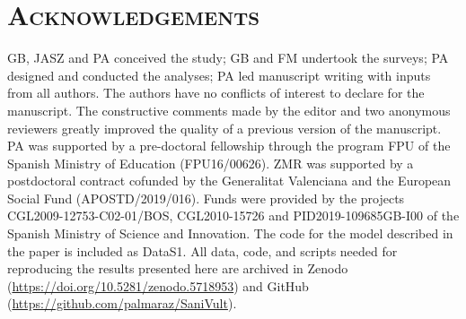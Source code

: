 \documentclass[12pt]{article}
\begin{document}
\section*{\textsc{Acknowledgements}}
GB, JASZ and PA conceived the study; GB and FM undertook the surveys; PA designed and conducted the analyses; PA led manuscript writing with inputs from all authors. The authors have no conflicts of interest to declare for the manuscript. The constructive comments made by the editor and two anonymous reviewers greatly improved the quality of a previous version of the manuscript. PA was supported by a pre-doctoral fellowship through the program FPU of the Spanish Ministry of Education (FPU16/00626). ZMR was supported by a postdoctoral contract cofunded by the Generalitat Valenciana and the European Social Fund (APOSTD/2019/016). Funds were provided by the projects CGL2009-12753-C02-01/BOS, CGL2010-15726 and PID2019-109685GB-I00 of the Spanish Ministry of Science and Innovation. The code for the model described in the paper is included as DataS1. All data, code, and scripts needed for reproducing the results presented here are archived in Zenodo (\url{https://doi.org/10.5281/zenodo.5718953})  and GitHub (\url{https://github.com/palmaraz/SaniVult}).

%
\end{document}

